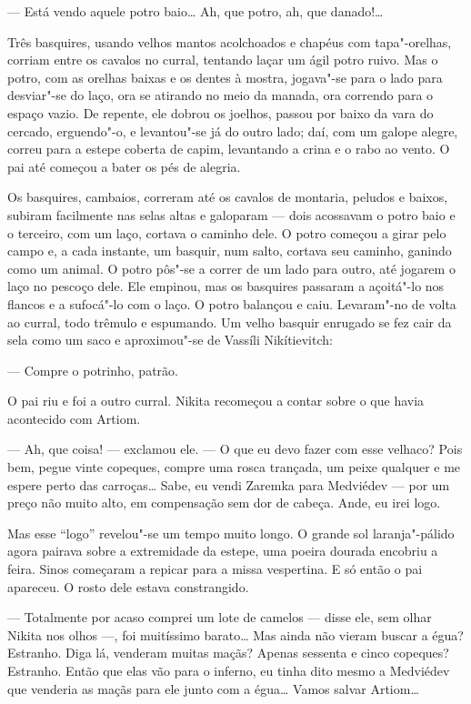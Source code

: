 --- Está vendo aquele potro baio\ldots{} Ah, que potro, ah, que danado!\ldots{}

Três basquires, usando velhos mantos acolchoados e chapéus com
tapa"-orelhas, corriam entre os cavalos no curral, tentando laçar um ágil
potro ruivo. Mas o potro, com as orelhas baixas e os dentes à mostra,
jogava"-se para o lado para desviar"-se do laço, ora se atirando no meio da
manada, ora correndo para o espaço vazio. De repente, ele dobrou os
joelhos, passou por baixo da vara do cercado, erguendo"-o, e levantou"-se
já do outro lado; daí, com um galope alegre, correu para a estepe
coberta de capim, levantando a crina e o rabo ao vento. O pai até
começou a bater os pés de alegria.

Os basquires, cambaios, correram até os cavalos de montaria, peludos e
baixos, subiram facilmente nas selas altas e galoparam --- dois
acossavam o potro baio e o terceiro, com um laço, cortava o caminho
dele. O potro começou a girar pelo campo e, a cada instante, um basquir,
num salto, cortava seu caminho, ganindo como um animal. O potro pôs"-se a
correr de um lado para outro, até jogarem o laço no pescoço dele.
Ele empinou, mas os basquires passaram a açoitá"-lo nos flancos e a
sufocá"-lo com o laço. O potro balançou e caiu. Levaram"-no de volta ao
curral, todo trêmulo e espumando. Um velho basquir enrugado se fez cair
da sela como um saco e aproximou"-se de Vassíli Nikítievitch:

--- Compre o potrinho, patrão.

O pai riu e foi a outro curral. Nikita recomeçou a contar sobre o que
havia acontecido com Artiom.

--- Ah, que coisa! --- exclamou ele. --- O que eu devo fazer com esse
velhaco? Pois bem, pegue vinte copeques, compre uma rosca trançada, um
peixe qualquer e me espere perto das carroças\ldots{} Sabe, eu vendi Zaremka
para Medviédev --- por um preço não muito alto, em compensação sem dor
de cabeça. Ande, eu irei logo.

Mas esse ``logo'' revelou"-se um tempo muito longo. O grande sol
laranja"-pálido agora pairava sobre a extremidade da estepe, uma poeira
dourada encobriu a feira. Sinos começaram a repicar para a missa
vespertina. E só então o pai apareceu. O rosto dele estava constrangido.

--- Totalmente por acaso comprei um lote de camelos --- disse ele, sem
olhar Nikita nos olhos ---, foi muitíssimo barato\ldots{} Mas ainda não
vieram buscar a égua? Estranho. Diga lá, venderam muitas maçãs? Apenas
sessenta e cinco copeques? Estranho. Então que elas vão para o inferno,
eu tinha dito mesmo a Medviédev que venderia as maçãs para ele junto com
a égua\ldots{} Vamos salvar Artiom\ldots{}

